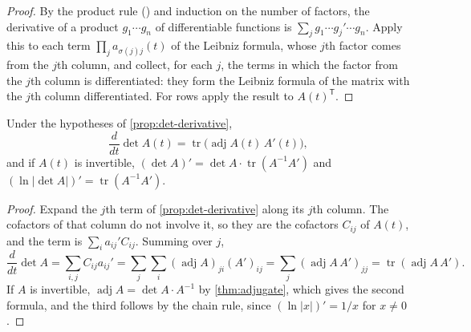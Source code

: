 \begin{proof}
By the product rule () and induction on the number of factors, the derivative of a product $g_1\cdots g_n$ of differentiable functions is $\sum_jg_1\cdots g_j'\cdots g_n$. Apply this to each term $\prod_ja_{\sigma(j)j}(t)$ of the Leibniz formula, whose $j$th factor comes from the $j$th column, and collect, for each $j$, the terms in which the factor from the $j$th column is differentiated: they form the Leibniz formula of the matrix with the $j$th column differentiated. For rows apply the result to $A(t)^{\mathsf T}$.
\end{proof}

\begin{theorem}
\label{thm:jacobi-formula}
Under the hypotheses of \cref{prop:det-derivative},
\[
\frac{d}{dt}\det A(t)=\operatorname{tr}\bigl(\operatorname{adj}A(t)\,A'(t)\bigr),
\]
and if $A(t)$ is invertible, $(\det A)'=\det A\cdot\operatorname{tr}(A^{-1}A')$ and $(\ln|\det A|)'=\operatorname{tr}(A^{-1}A')$.
\end{theorem}

\begin{proof}
Expand the $j$th term of \cref{prop:det-derivative} along its $j$th column. The cofactors of that column do not involve it, so they are the cofactors $C_{ij}$ of $A(t)$, and the term is $\sum_ia_{ij}'C_{ij}$. Summing over $j$,
\[
\frac{d}{dt}\det A=\sum_{i,j}C_{ij}a_{ij}'=\sum_j\sum_i(\operatorname{adj}A)_{ji}(A')_{ij}=\sum_j(\operatorname{adj}A\,A')_{jj}=\operatorname{tr}(\operatorname{adj}A\,A').
\]
If $A$ is invertible, $\operatorname{adj}A=\det A\cdot A^{-1}$ by \cref{thm:adjugate}, which gives the second formula, and the third follows by the chain rule, since $(\ln|x|)'=1/x$ for $x\ne0$.
\end{proof}

